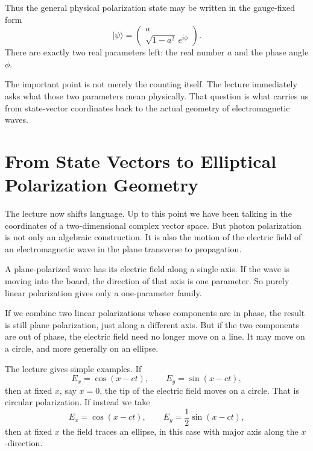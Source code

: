 Thus the general physical polarization state may be written in the gauge-fixed form
\begin{equation}
|\psi\rangle=
\begin{pmatrix}
a\\
\sqrt{1-a^2}\,e^{i\phi}
\end{pmatrix}.
\end{equation}
There are exactly two real parameters left: the real number $a$ and the phase angle $\phi$.

The important point is not merely the counting itself. The lecture immediately asks what those two parameters mean physically. That question is what carries us from state-vector coordinates back to the actual geometry of electromagnetic waves.

\section{From State Vectors to Elliptical Polarization Geometry}

The lecture now shifts language. Up to this point we have been talking in the coordinates of a two-dimensional complex vector space. But photon polarization is not only an algebraic construction. It is also the motion of the electric field of an electromagnetic wave in the plane transverse to propagation.

A plane-polarized wave has its electric field along a single axis. If the wave is moving into the board, the direction of that axis is one parameter. So purely linear polarization gives only a one-parameter family.

If we combine two linear polarizations whose components are in phase, the result is still plane polarization, just along a different axis. But if the two components are out of phase, the electric field need no longer move on a line. It may move on a circle, and more generally on an ellipse.

The lecture gives simple examples. If
\begin{equation}
E_x=\cos(x-ct),
\qquad
E_y=\sin(x-ct),
\end{equation}
then at fixed $x$, say $x=0$, the tip of the electric field moves on a circle. That is circular polarization. If instead we take
\begin{equation}
E_x=\cos(x-ct),
\qquad
E_y=\frac12\sin(x-ct),
\end{equation}
then at fixed $x$ the field traces an ellipse, in this case with major axis along the $x$-direction.


